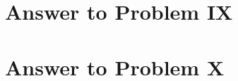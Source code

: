 \documentclass[11pt,a4paper]{article}
\begin{document}
\clearpage
\section{Answer to Problem IX}\label{sec:P09}



\clearpage
\section{Answer to Problem X}\label{sec:P10}



\clearpage

\printbibliography

\end{document}
